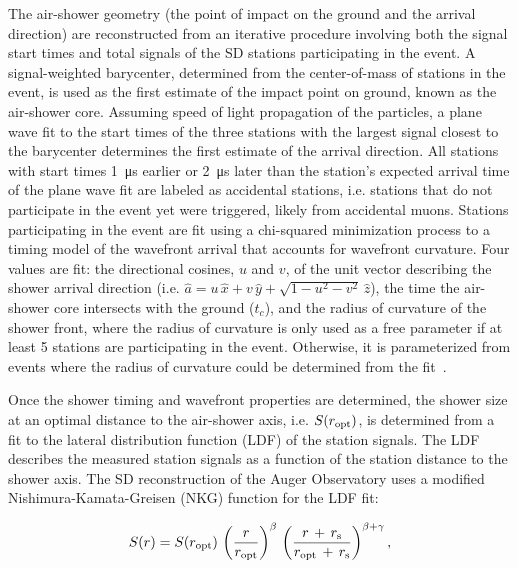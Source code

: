 The air-shower geometry (the point of impact on the ground and the arrival direction) are reconstructed from an iterative procedure involving both the signal start times and total signals of the SD stations participating in the event.
A signal-weighted barycenter, determined from the center-of-mass of stations in the event, is used as the first estimate of the impact point on ground, known as the air-shower core.
Assuming speed of light propagation of the particles, a plane wave fit to the start times of the three stations with the largest signal closest to the barycenter determines the first estimate of the arrival direction.
All stations with start times \qty{1}{\micro\second} earlier or \qty{2}{\micro\second} later than the station's expected arrival time of the plane wave fit are labeled as accidental stations, i.e. stations that do not participate in the event yet were triggered, likely from accidental muons.
Stations participating in the event are fit using a chi-squared minimization process to a timing model of the wavefront arrival that accounts for wavefront curvature.
Four values are fit: the directional cosines, $u$ and $v$, of the unit vector describing the shower arrival direction (i.e. $\hat{a} = u\,\hat{x} + v\,\hat{y} + \sqrt{1 - u^{2} - v^{2}}\,\hat{z}$), the time the air-shower core intersects with the ground ($t_{c}$), and the radius of curvature of the shower front, where the radius of curvature is only used as a free parameter if at least 5 stations are participating in the event.
Otherwise, it is parameterized from events where the radius of curvature could be determined from the fit~\cite{auger_jinst2020_sdreconstruction}.

Once the shower timing and wavefront properties are determined, the shower size at an optimal distance to the air-shower axis, i.e. $S(r_{\rm opt})$, is determined from a fit to the lateral distribution function (LDF) of the station signals.
The LDF describes the measured station signals as a function of the station distance to the shower axis.
The SD reconstruction of the Auger Observatory uses a modified Nishimura-Kamata-Greisen (NKG) function for the LDF fit:

\begin{equation}
    S(r) = S(r_{\rm opt})\,\left( \frac{r}{r_{\rm opt}} \right)^{\beta}\,\left( \frac{r\,+\,r_{\rm s}}{r_{\rm opt}\,+\,r_{\rm s}} \right)^{\beta + \gamma}, \label{eq:modified_NKG_ldf}
\end{equation}

